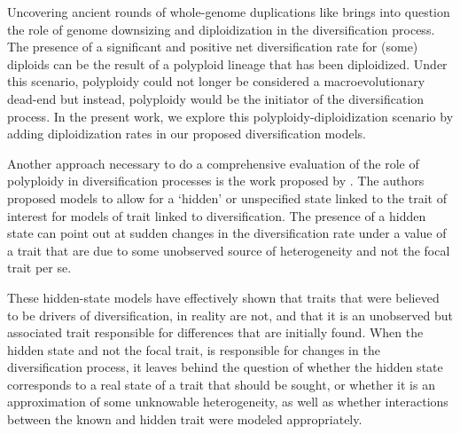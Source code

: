 Uncovering ancient rounds of whole-genome duplications like\citet{landis_2018}  brings into question  the role of genome downsizing and diploidization in the diversification process\citep{soltis_2015diploidization, dodsworth_2015}. 
The presence of  a significant  and positive net diversification rate for (some) diploids can be  the result of a polyploid lineage that has been diploidized. Under this scenario, polyploidy could not longer be considered a macroevolutionary dead-end but instead, polyploidy would be the initiator of the diversification process. In the present work, we explore this polyploidy-diploidization scenario by adding diploidization rates in our proposed diversification models.



Another approach necessary to do a comprehensive evaluation of the role of polyploidy in diversification processes is the work proposed by \citet{beaulieu_2016}. The authors proposed models to  allow for a `hidden' or unspecified state linked to the trait of interest for models of trait linked to diversification. The presence of a hidden state can point out at sudden changes in the diversification rate under a value of a trait that are due to some unobserved source of heterogeneity and not the focal trait per se.  %

These hidden-state  models have effectively shown that traits that were believed to be drivers of diversification, in reality are not, and that it is an unobserved but associated trait responsible for differences that are initially found.  When the hidden state and not the focal trait, is responsible for changes in the diversification process, it leaves behind the question of whether the hidden state corresponds to a real state of a trait that should be sought, or whether it is an approximation of some unknowable heterogeneity, as well as whether interactions between the known and hidden trait were modeled appropriately.

